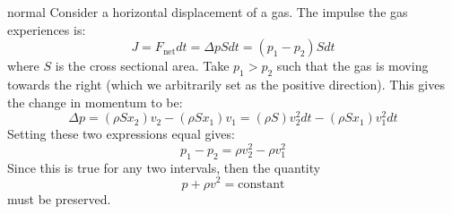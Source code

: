 \begin{solution}{normal}
Consider a horizontal displacement of a gas. The impulse the gas experiences is:
$$J = F_\text{net} dt = \Delta p S dt = (p_1-p_2)Sdt$$
where $S$ is the cross sectional area. Take $p_1 > p_2$ such that the gas is moving towards the right (which we arbitrarily set as the positive direction). This gives the change in momentum to be:
$$\Delta p =(\rho Sx_2)v_2-(\rho Sx_1)v_1 =(\rho S)v_2^2 dt-(\rho Sx_1)v_1^2 dt$$
Setting these two expressions equal gives:
$$p_1-p_2=\rho v_2^2 - \rho v_1^2$$
Since this is true for any two intervals, then the quantity
$$p+\rho v^2 = \text{constant}$$
must be preserved.
\end{solution}